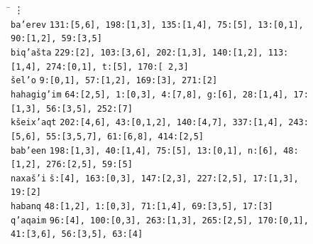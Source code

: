 \begin{figure}[t]
\small
\begin{mdframed}
\begin{tabbing}
\hspace{1in} \= \hspace{5.5in} \kill
 \vdots \> \\
 \texttt{ba\a'{e}rev} \> \texttt{131:[5,6], 198:[1,3], 135:[1,4], 75:[5], 13:[0,1], 90:[1,2], 59:[3,5]} \\
\texttt{biq\a'{a}\v{s}ta} \> \texttt{229:[2], 103:[3,6], 202:[1,3], 140:[1,2], 113:[1,4], 274:[0,1], t:[5], 170:[ 2,3]} \\
\texttt{\v{s}el\a'{o}} \> \texttt{9:[0,1], 57:[1,2], 169:[3], 271:[2]} \\
\texttt{hahagig\a'{i}m} \> \texttt{64:[2,5], 1:[0,3], 4:[7,8], g:[6], 28:[1,4], 17:[1,3], 56:[3,5], 252:[7]} \\
\texttt{k\v{s}eix\a'{a}qt} \> \texttt{202:[4,6], 43:[0,1,2], 140:[4,7], 337:[1,4], 243:[5,6], 55:[3,5,7], 61:[6,8], 414:[2,5]} \\
\texttt{bab\a'{e}en} \> \texttt{198:[1,3], 40:[1,4], 75:[5], 13:[0,1], n:[6], 48:[1,2], 276:[2,5], 59:[5]} \\
\texttt{naxa\v{s}\a'{i}} \> \texttt{\v{s}:[4], 163:[0,3], 147:[2,3], 227:[2,5], 17:[1,3], 19:[2]} \\
\texttt{habanq} \> \texttt{48:[1,2], 1:[0,3], 71:[1,4], 69:[3,5], 17:[3]} \\
\texttt{q\a'{a}qaim} \> \texttt{96:[4], 100:[0,3], 263:[1,3], 265:[2,5], 170:[0,1], 41:[3,6], 56:[3,5], 63:[4]} \\

\end{tabbing}
\end{mdframed}
\end{figure}
